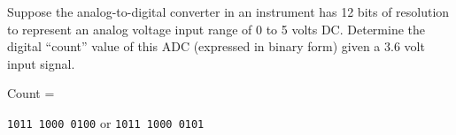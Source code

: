 

Suppose the analog-to-digital converter in an instrument has 12 bits of resolution to represent an analog voltage input range of 0 to 5 volts DC.  Determine the digital ``count'' value of this ADC (expressed in binary form) given a 3.6 volt input signal.

\vskip 10pt

Count = \underbar{\hskip 50pt}

\vskip 10pt







{\tt 1011 1000 0100} \hskip 20pt or \hskip 20pt {\tt 1011 1000 0101}











